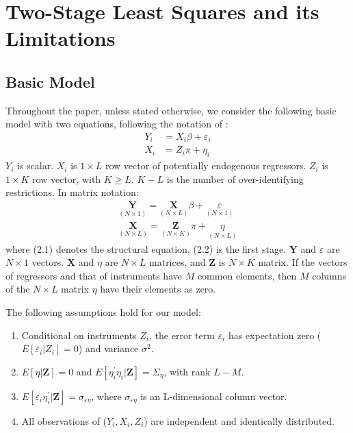 \section{Two-Stage Least Squares and its Limitations}

\subsection{Basic Model}
Throughout the paper, unless stated otherwise, we consider the following basic model with two equations, following the notation of \cite{angrist1999jackknife}:
\begin{align*}
Y_i &= X_i\beta + \varepsilon_i \\
X_i &= Z_i\pi + \eta_i
\end{align*}
$Y_i$ is scalar. $X_i$ is $1\times L$ row vector of potentially endogenous regressors. 
$Z_i$ is $1\times K$ row vector, with $K\geq L$. 
$K-L$ is the number of over-identifying restrictions. In matrix notation:\\
\begin{align}
\underset{(N\times 1)}{\mathbf{Y}} = \underset{(N\times L)}{\mathbf{X}}\beta + \underset{(N\times 1)}{\varepsilon} \\
\underset{(N\times L)}{\mathbf{X}} =  \underset{(N\times K)}{\mathbf{Z}}\pi + \underset{(N\times L)}{\eta}
\end{align}
where (2.1) denotes the structural equation, (2.2) is the first stage. $\mathbf{Y}$ and $\varepsilon$ are $N \times 1$ vectors. 
$\mathbf{X}$ and $\eta$ are $N \times L$ matrices, and $\mathbf{Z}$ is $N \times K$ matrix. If the vectors of regressors and that of instruments have $M$ common elements, then $M$ columns of the $N \times L$ matrix $\eta$ have their elements as zero.
\par The following assumptions hold for our model:
\begin{enumerate}
\item Conditional on instruments $Z_i$, the error term $\varepsilon_i$ has expectation zero ($E[\varepsilon_i|Z_i]=0$) and variance $\sigma^2$.
\item $E[\eta|\mathbf Z]=0$ and $E[\eta_i^\prime\eta_i|\mathbf Z]=\Sigma_\eta$, with rank $L-M$.
\item $E[\varepsilon_i\eta_i^\prime|\mathbf Z]=\sigma_{\varepsilon\eta}$, where $\sigma_{\varepsilon\eta}$ is an L-dimensional column vector.
\item All observations of ($Y_i, X_i, Z_i$) are independent and identically distributed.
\end{enumerate}

